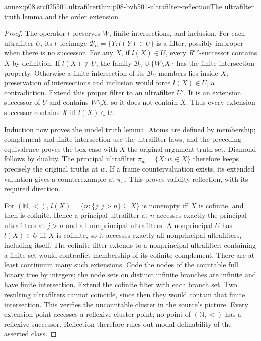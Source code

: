 \begin{annexitem}{annex:p08.src025501.ultrafilter}{thm:p08-bvb501-ultrafilter-reflection}{The ultrafilter truth lemma and the order extension}
\begin{proof}
The operator \(l\) preserves \(W\), finite intersections, and
inclusion. For each ultrafilter \(U\), its \(l\)-preimage
\(\mathcal B_U=\{Y:l(Y)\in U\}\) is a filter, possibly
improper when there is no successor. For any \(X\), if
\(l(X)\in U\), every \(R^{\mathrm{ue}}\)-successor contains
\(X\) by definition. If \(l(X)\notin U\), the family
\(\mathcal B_U\cup\{W\setminus X\}\) has the finite
intersection property. Otherwise a finite intersection of its
\(\mathcal B_U\) members lies inside \(X\); preservation of
intersections and inclusion would force \(l(X)\in U\), a
contradiction. Extend this proper filter to an ultrafilter \(U'\).
It is an extension successor of \(U\) and contains \(W\setminus X\),
so it does not contain \(X\). Thus every extension successor contains
\(X\) iff \(l(X)\in U\).

Induction now proves the model truth lemma. Atoms are defined by
membership; complement and finite intersection use the ultrafilter laws,
and the preceding equivalence proves the box case with
\(X\) the original argument truth set. Diamond follows by duality.
The principal ultrafilter \(\pi_w=\{X:w\in X\}\) therefore
keeps precisely the original truths at \(w\). If a frame countervaluation
exists, its extended valuation gives a counterexample at \(\pi_w\).
This proves validity reflection, with its required direction.

For \((\mathbb N,<)\), \(l(X)=\{n:\{j:j>n\}\subseteq X\}\)
is nonempty iff \(X\) is cofinite, and then is cofinite. Hence a
principal ultrafilter at \(n\) accesses exactly the principal
ultrafilters at \(j>n\) and all nonprincipal ultrafilters. A
nonprincipal \(U\) has \(l(X)\in U\) iff \(X\) is cofinite,
so it accesses exactly all nonprincipal ultrafilters, including itself.
The cofinite filter extends to a nonprincipal ultrafilter: containing a
finite set would contradict membership of its cofinite complement.
There are at least continuum many such extensions. Code the nodes of
the countable full binary tree by integers; the node sets on distinct
infinite branches are infinite and have finite intersection. Extend
the cofinite filter with each branch set. Two resulting ultrafilters
cannot coincide, since then they would contain that finite intersection.
This verifies the uncountable cluster in the source's picture.
Every extension point accesses a reflexive cluster point; no point
of \((\mathbb N,<)\) has a reflexive successor. Reflection therefore
rules out modal definability of the asserted class.
\end{proof}
\end{annexitem}

